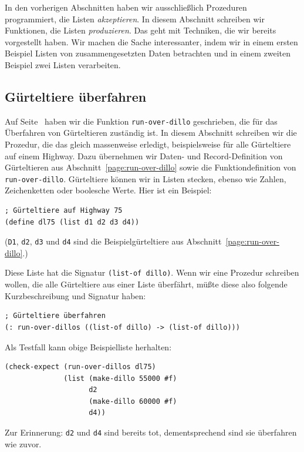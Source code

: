 In den vorherigen Abschnitten haben wir ausschließlich Prozeduren
programmiert, die Listen \emph{akzeptieren}.  In diesem Abschnitt
schreiben wir Funktionen, die Listen \emph{produzieren}.  Das geht mit
Techniken, die wir bereits vorgestellt haben.  Wir machen die Sache
interessanter, indem wir in einem ersten Beispiel Listen von
zusammengesetzten Daten betrachten und in einem zweiten Beispiel zwei
Listen verarbeiten.

\subsection{Gürteltiere überfahren}

Auf Seite~\pageref{page:run-over-dillo} haben wir die Funktion
\texttt{run-over-dillo} geschrieben, die für das Überfahren von
Gürteltieren zuständig ist.  In diesem Abschnitt schreiben wir die
Prozedur, die das gleich massenweise erledigt, beispielsweise für alle
Gürteltiere auf einem Highway.  Dazu übernehmen wir Daten- und
Record-Definition von Gürteltieren aus
Abschnitt~\ref{page:run-over-dillo} sowie die Funktiondefinition von
\texttt{run-over-dillo}.  Gürteltiere können wir in Listen stecken,
ebenso wie Zahlen, Zeichenketten oder boolesche Werte.  Hier ist ein
Beispiel:
%
\begin{verbatim}
; Gürteltiere auf Highway 75
(define dl75 (list d1 d2 d3 d4))
\end{verbatim}
(\texttt{D1}, \texttt{d2}, \texttt{d3} und \texttt{d4} sind die
Beispielgürteltiere aus Abschnitt~\ref{page:run-over-dillo}.)

Diese Liste hat die Signatur \texttt{(list-of dillo)}.  Wenn wir eine
Prozedur schreiben wollen, die alle Gürteltiere aus einer Liste
überfährt, müßte diese also folgende Kurzbeschreibung und Signatur
haben:
%
\begin{verbatim}
; Gürteltiere überfahren
(: run-over-dillos ((list-of dillo) -> (list-of dillo)))
\end{verbatim}
%
Als Testfall kann obige Beispielliste herhalten:
%
\begin{verbatim}
(check-expect (run-over-dillos dl75)
              (list (make-dillo 55000 #f)
                    d2
                    (make-dillo 60000 #f)
                    d4))
\end{verbatim}
%
Zur Erinnerung: \texttt{d2} und \texttt{d4} sind bereits tot,
dementsprechend sind sie überfahren wie zuvor.

